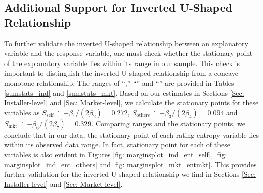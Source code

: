 \documentclass[msom,blindrev]{informs3}
\begin{document}
	
	
	
	
	\subsection{Additional Support for Inverted U-Shaped Relationship}
	
	To further validate the inverted U-shaped relationship between an explanatory variable and the response variable, one must check whether the stationary point of the explanatory variable lies within its range in our sample. This check is important to distinguish the inverted U-shaped relationship from a concave monotone relationship.  The ranges of ``,'' ``'' and ``'' are provided in Tables \ref{sumstats_ind} and \ref{sumstats_mkt}.
	Based on our estimates in Sections \ref{Sec: Installer-level} and \ref{Sec: Market-level}, we calculate the stationary points for these variables as $S_{\text{self}} \doteq - \beta_{1}/ (2 \beta_{2}) = 0.272$, $S_{\text{others}} \doteq  - \beta_{3}/(2 \beta_{4}) =0.094 $ and $S_{\text{mkt}} \doteq - \beta_{6}/(2 \beta_{7}) =0.329$. Comparing ranges and the stationary points, we conclude that in our data, the stationary point of each rating entropy variable lies within its observed data range. In fact, stationary point for each of these variables is also evident in Figures \ref{fig: marginsplot_ind_ent_self}, \ref{fig: marginsplot_ind_ent_others} and \ref{fig: marginsplot_mkt_entmkt}. This provides further validation for the inverted U-shaped relationship we find in Sections \ref{Sec: Installer-level} and \ref{Sec: Market-level}.
	
\end{document}
